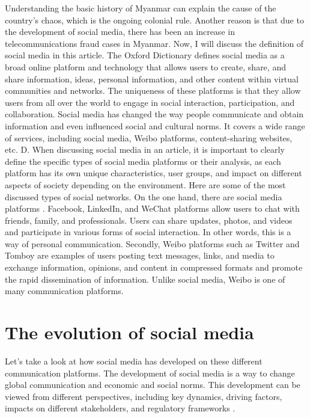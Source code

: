 \documentclass[man,floatsintext]{apa7}
\begin{document}
Understanding the basic history of Myanmar can explain the cause of the country's chaos, which is the ongoing colonial rule. Another reason is that due to the development of social media, there has been an increase in telecommunications fraud cases in Myanmar. Now, I will discuss the definition of social media in this article. The Oxford Dictionary defines social media as a broad online platform and technology that allows users to create, share, and share information, ideas, personal information, and other content within virtual communities and networks. The uniqueness of these platforms is that they allow users from all over the world to engage in social interaction, participation, and collaboration. Social media has changed the way people communicate and obtain information and even influenced social and cultural norms. It covers a wide range of services, including social media, Weibo platforms, content-sharing websites, etc. D. When discussing social media in an article, it is important to clearly define the specific types of social media platforms or their analysis, as each platform has its own unique characteristics, user groups, and impact on different aspects of society depending on the environment. Here are some of the most discussed types of social networks. On the one hand, there are social media platforms \autocite{rainieSocialNetworkingSites2011}. Facebook, LinkedIn, and WeChat platforms allow users to chat with friends, family, and professionals. Users can share updates, photos, and videos and participate in various forms of social interaction. In other words, this is a way of personal communication. Secondly, Weibo platforms such as Twitter and Tomboy are examples of users posting text messages, links, and media to exchange information, opinions, and content in compressed formats and promote the rapid dissemination of information. Unlike social media, Weibo is one of many communication platforms.

\section{The evolution of social media}

Let's take a look at how social media has developed on these different communication platforms. The development of social media is a way to change global communication and economic and social norms. This development can be viewed from different perspectives, including key dynamics, driving factors, impacts on different stakeholders, and regulatory frameworks \autocite{weberEmergenceEvolutionSocial2016}.
\end{document}
